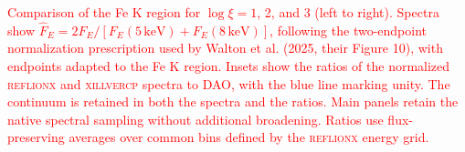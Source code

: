 \caption{\textcolor{red}{Comparison of the Fe K region for
$\log\xi=1$, 2, and 3 (left to right).
Spectra show $\widehat{F}_E=2F_E/[F_E(5\,\mathrm{keV})+F_E(8\,\mathrm{keV})]$,
following the two-endpoint normalization prescription used by Walton et al.
(2025, their Figure 10), with endpoints adapted to the Fe K region.
Insets show the ratios of the normalized \textsc{reflionx} and
\textsc{xillvercp} spectra to \textsc{DAO}, with the blue line marking unity.
The continuum is retained in both the spectra and the ratios.
Main panels retain the native spectral sampling without additional
broadening. Ratios use flux-preserving averages over common bins defined
by the \textsc{reflionx} energy grid.}}
\label{fig:iron_line_zoom}
